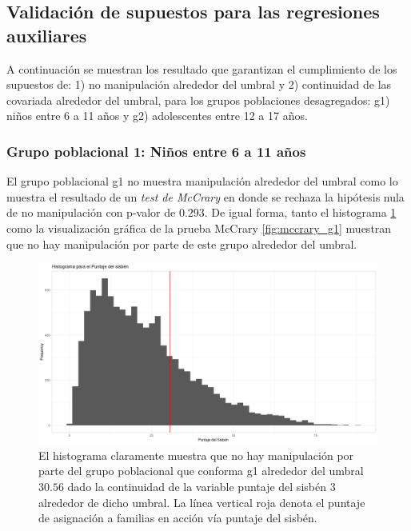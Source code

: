 \documentclass[AER]{AEA}
\begin{document}
\subsection{Validación de supuestos para las regresiones auxiliares}

A continuación se muestran los resultado que garantizan el cumplimiento de los supuestos de: 1) no manipulación alrededor del umbral y 2) continuidad de las covariada alrededor del umbral, para los grupos poblaciones desagregados: g1) niños entre 6 a 11 años y g2) adolescentes entre 12 a 17 años. 

\subsubsection{Grupo poblacional 1: Niños entre 6 a 11 años}

El grupo poblacional g1 no muestra manipulación alrededor del umbral como lo muestra el resultado de un \textit{test de McCrary} en donde se rechaza la hipótesis nula de no manipulación con p-valor de $0.293$. De igual forma, tanto el histograma \ref{fig:hist_g1} como la visualización gráfica de la prueba McCrary \ref{fig:mccrary_g1} muestran que no hay manipulación por parte de este grupo alrededor del umbral. 

\begin{figure}[h!]
    \centering
    \includegraphics[scale = 0.35]{imagenes/estimaxs_adicionales/histograma_g1.png}
    \caption{El histograma claramente muestra que no hay manipulación por parte del grupo poblacional que conforma g1 alrededor del umbral $30.56$ dado la continuidad de la variable puntaje del sisbén 3 alrededor de dicho umbral. La línea vertical roja denota el puntaje de asignación a familias en acción vía puntaje del sisbén.}
    \label{fig:hist_g1}
\end{figure}
\end{document}
